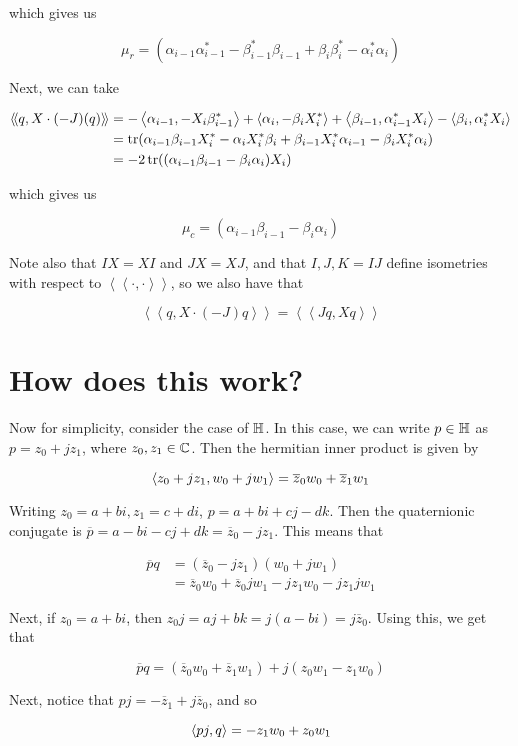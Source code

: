 \documentclass{article}
\newcommand{\iinner}[1]{\left\langle\!\left\langle #1 \right\rangle\!\right\rangle}
\begin{document}
which gives us

\[\mu_r = (\alpha_{i-1}\alpha_{i-1}^* - \beta_{i-1}^*\beta_{i-1} + \beta_i\beta_i^* -\alpha_i^*\alpha_i)\]

Next, we can take

\begin{align*}
    \iinner{q, X\cdot (-J)(q)} &= -\inner{\alpha_{i-1}, -X_i\beta_{i-1}^*} + \inner{\alpha_i, -\beta_iX_i^*} + \inner{\beta_{i-1}, \alpha_{i-1}^*X_i} - \inner{\beta_i, \alpha_i^*X_i} \\
    &= \tr(\alpha_{i-1}\beta_{i-1}X_i^* - \alpha_iX_i^*\beta_i + \beta_{i-1}X_i^*\alpha_{i-1} - \beta_iX_i^*\alpha_i) \\
    &= -2\tr((\alpha_{i-1}\beta_{i-1} - \beta_i\alpha_i)X_i)
\end{align*}

which gives us

\[\mu_c = (\alpha_{i-1}\beta_{i-1} - \beta_i\alpha_i)\]

Note also that \(IX = XI\) and \(JX = XJ\), and that \(I, J, K=IJ\) define isometries with respect to \(\iinner{\cdot, \cdot}\), so we also have that

\[\iinner{q, X \cdot (-J)q} = \iinner{Jq, Xq}\]

\section{How does this work?}

Now for simplicity, consider the case of \(\mathbb{H}\). In this case, we can write \(p \in \mathbb{H}\) as \(p = z_0 + jz_1\), where \(z_0, z_1 \in \mathbb{C}\). Then the hermitian inner product is given by

\[\left\langle z_0 + jz_1, w_0 + jw_1 \right\rangle = \overline z_0 w_0 + \overline z_1 w_1\]

Writing \(z_0 = a+bi, z_1 = c+ di\), \(p = a + bi + cj - dk\). Then the quaternionic conjugate is \(\overline p = a - bi - cj + dk = \overline z_0 - jz_1\). This means that

\begin{align*}
    \overline pq &= (\overline z_0 - jz_1)(w_0 + jw_1) \\
    &= \overline z_0w_0 + \overline z_0jw_1 - jz_1w_0 - jz_1jw_1
\end{align*}

Next, if \(z_0 = a + bi\), then \(z_0j = aj + bk = j(a - bi) = j\overline z_0\). Using this, we get that

\[\overline p q = (\overline z_0w_0 + \overline z_1w_1) + j(z_0w_1 - z_1w_0)\]

Next, notice that \(pj =  -\overline z_1 + j \overline z_0\), and so

\[\left\langle pj, q \right\rangle = -z_1 w_0 + z_0w_1\]
\printbibliography
\end{document}
